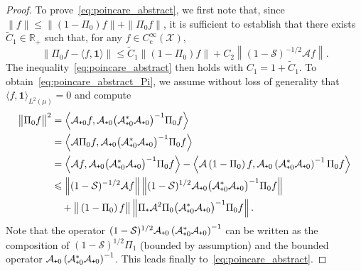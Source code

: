 \documentclass[10pt]{amsart}
\theoremstyle{definition}\newtheorem{defi}[theo]{Definition}\newtheorem{rema}[theo]{Remark}\newtheorem{exam}[theo]{Example}\newtheorem{exem}[theo]{Example}\newtheorem{nota}[theo]{Notation}
\newcommand{\rmc}{\mathrm{c}}
\newcommand{\cLs}{\mathcal{S}}
\newcommand{\cLa}{\mathcal{A}}
\newcommand{\cX}{\mathcal{X}}
\newcommand{\R}{\mathbb{R}}
\newcommand{\bfun}{\mathbf{1}}
\newcommand{\subplus}{\textnormal{\texttt{+}}}
\renewcommand{\leq}{\leqslant}
\begin{document}
\begin{proof}
To prove~\eqref{eq:poincare_abstract}, we first note that, since $\| f \| \leq \| (1-\Pi_0)f \| + \| \Pi_0 f \|$, it is sufficient to establish that there exists $\widetilde{C}_1 \in \R_+$ such that, for any $f \in C_\rmc^\infty(\cX)$,
\begin{equation}\label{eq:poincare_abstract_Pi}
\big\| \Pi_0 f - \langle f,\bfun\rangle \big\| \leq \widetilde{C}_1 \big\| \left(1-\Pi_0\right)f \big\| + C_2 \left\| (1-\cLs)^{-1/2} \cLa f \right\|.
\end{equation}
The inequality~\eqref{eq:poincare_abstract} then holds with $C_1 = 1 + \widetilde{C}_1$. To obtain~\eqref{eq:poincare_abstract_Pi}, we assume without loss of generality that $\langle f,\bfun\rangle_{L^2(\mu)} = 0$ and compute
\begin{align*}
\big\| \Pi_0 f \big\|^2 & = \left\langle \cLa_{\subplus 0} f, \cLa_{\subplus 0} \big(\cLa_{\subplus 0}^* \cLa_{\subplus 0}\big)^{-1} \Pi_0 f \right\rangle \\
& = \left\langle \cLa \Pi_0 f, \cLa_{\subplus 0} \big(\cLa_{\subplus 0}^* \cLa_{\subplus 0}\big)^{-1} \Pi_0 f \right\rangle \\
& = \left\langle \cLa f, \cLa_{\subplus 0} \big(\cLa_{\subplus 0}^* \cLa_{\subplus 0}\big)^{-1} \Pi_0 f \right\rangle - \left\langle \cLa \left(1-\Pi_0\right) f, \cLa_{\subplus 0} \left(\cLa_{\subplus 0}^* \cLa_{\subplus 0}\right)^{-1} \Pi_0 f \right\rangle \\
& \leq \left\|(1-\cLs)^{-1/2}\cLa f\right\| \left\|(1-\cLs)^{1/2} \cLa_{\subplus 0} \big(\cLa_{\subplus 0}^* \cLa_{\subplus 0}\big)^{-1} \Pi_0 f \right\| \\
& \quad + \big\|\left(1-\Pi_0\right)f\big\| \left\| \Pi_\subplus \cLa^2 \Pi_0 \big(\cLa_{\subplus 0}^* \cLa_{\subplus 0}\big)^{-1} \Pi_0 f \right\|.
\end{align*}
Note that the operator $(1-\cLs)^{1/2} \cLa_{\subplus 0} \left(\cLa_{\subplus 0}^* \cLa_{\subplus 0}\right)^{-1}$ can be written as the composition of $(1-\cLs)^{1/2} \Pi_1$ (bounded by assumption) and the bounded operator $\cLa_{\subplus 0} \left(\cLa_{\subplus 0}^* \cLa_{\subplus 0}\right)^{-1}$. This leads finally to~\eqref{eq:poincare_abstract}.
\end{proof}
\end{document}
